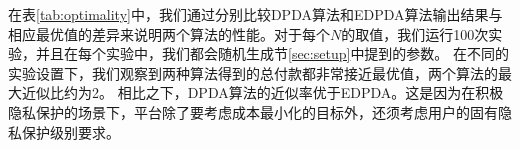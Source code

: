 	
	
	
	在表\ref{tab:optimality}中，我们通过分别比较DPDA算法和EDPDA算法输出结果与相应最优值的差异来说明两个算法的性能。对于每个$N$的取值，我们运行100次实验，并且在每个实验中，我们都会随机生成节\ref{sec:setup}中提到的参数。
	在不同的实验设置下，我们观察到两种算法得到的总付款都非常接近最优值，两个算法的最大近似比约为2。
	相比之下，DPDA算法的近似率优于EDPDA。这是因为在积极隐私保护的场景下，平台除了要考虑成本最小化的目标外，还须考虑用户的固有隐私保护级别要求。
	
%

